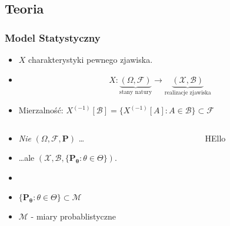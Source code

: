 \subsection{Teoria}

\begin{frame}
		\frametitle{Model Statystyczny}
	
	\begin{itemize}
		\item $X $ charakterystyki pewnego zjawiska.
		\item $$X: \underbrace{(\Omega, \mathcal{F})}_{\text{stany natury}}\rightarrow \underbrace{(\mathcal{X}, \mathcal{B})}_{\text{realizacje zjawiska}} $$
		\item Mierzalność: $ X^{(-1)} [ \mathcal{B}] = \{ X^{(-1)} [A] : A \in \mathcal{B} \} \subset \mathcal{F}$
	\end{itemize} 	


	\begin{columns}
	\begin{column}[t]{5cm}
		\begin{itemize}
			\item \emph{Nie} $( \Omega, \mathcal{F}, \mathbf{P} )$ \dots
			\item \dots ale $( \mathcal{X}, \mathcal{B}, \{\mathbf{P_\theta} : \theta \in \Theta\} )$.
			\item
			\item $\{\mathbf{P_\theta} : \theta \in \Theta\} \subset \mathcal{M} $
			\item $\mathcal{M}$ - miary probablistyczne
		\end{itemize}
	\end{column}
	\begin{column}[t]{5cm}
		\begin{center}
			HEllo	
		\end{center}		
	\end{column}
	\end{columns}
		
\end{frame}

